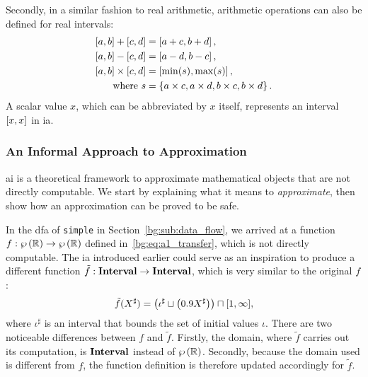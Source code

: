 Secondly, in a similar fashion to real arithmetic, arithmetic operations can
also be defined for real intervals:
\begin{equation}
    \begin{aligned}
        \left[{a}, {b}\right] + \left[{c}, {d}\right] &= \left[{a + c}, {b + d}\right], \\
        \left[{a}, {b}\right] - \left[{c}, {d}\right] &= \left[{a - d}, {b - c}\right], \\
        \left[{a}, {b}\right] \times \left[{c}, {d}\right]
            &= \left[{\min(s)}, {\max(s)}\right], \\
        \text{where~} s &= \left\{
            a \times c, a \times d, b \times c, b \times d
        \right\}.
    \end{aligned}
    \label{bg:eq:interval_operations}
\end{equation}
A scalar value $x$, which can be abbreviated by $x$ itself, represents an
interval $\left[{x}, {x}\right]$ in \gls{ia}.

\subsubsection{An Informal Approach to Approximation}
\label{bg:ssub:informal}

\Gls{ai} is a theoretical framework to approximate mathematical objects
that are not directly computable.  We start by explaining what it means to
\emph{approximate}, then show how an approximation can be proved to be safe.

In the \gls{dfa} of \verb|simple| in Section~\ref{bg:sub:data_flow}, we
arrived at a function $f: \wp\left({\mathbb{R}}\right) \to \wp\left({\mathbb{R}}\right)$ defined
in~\eqref{bg:eq:a1_transfer}, which is not directly computable.  The \gls{ia}
introduced earlier could serve as an inspiration to produce a different
function $\tilde{f}: \mathbf{Interval} \to \mathbf{Interval}$, which is very similar to
the original $f$:
\begin{equation}
    \tilde{f}(X^\sharp) = \left(
        \iota^\sharp \sqcup \left( 0.9 X^\sharp \right)
    \right) \sqcap [1, \infty],
    \label{bg:eq:a1_transfer_interval}
\end{equation}
where $\iota^\sharp$ is an interval that bounds the set of initial values
$\iota$.  There are two noticeable differences between $f$ and $\tilde{f}$.
Firstly, the domain, where $\tilde{f}$ carries out its computation, is
$\mathbf{Interval}$ instead of $\wp\left({\mathbb{R}}\right)$.  Secondly, because the domain
used is different from $f$, the function definition is therefore updated
accordingly for $\tilde{f}$.

